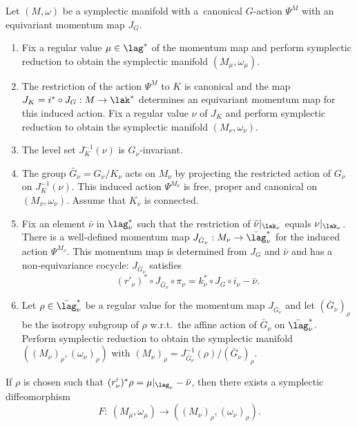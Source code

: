 \begin{theorem}\label{thm:hamredstages}
Let $(M,\omega)$ be a symplectic manifold with a~canonical $G$-action $\Psi^M$ with an equivariant momentum map $J_G$.
\begin{enumerate}\itemsep=0pt
\item[$1.$] Fix a regular value $\mu\in\lag^*$ of the momentum map and perform symplectic reduction to obtain the symplectic manifold $(M_\mu,\omega_\mu)$.
\item[$2.$] The restriction of the action $\Psi^M$ to $K$ is canonical and the map $J_K=i^*\circ J_G:M\to \lak^*$ determines an equivariant momentum map for this induced action. Fix a regular value $\nu$ of $J_K$ and perform symplectic reduction to obtain the symplectic manifold $(M_\nu,\omega_\nu)$.


\item[$3.$] The level set $J^{-1}_K(\nu)$ is $G_\nu$-invariant.
\item[$4.$] The group $\bar G_\nu =G_\nu/K_\nu$ acts on $M_\nu$ by projecting the restricted action of $G_\nu$ on $J^{-1}_K(\nu)$. This induced action $\Psi^{M_\nu}$ is free, proper and canonical on $(M_\nu, \omega_\nu)$. Assume that $K_\nu$ is connected.
\item[$5.$] Fix an element $\bar \nu$ in $\lag_\nu^*$ such that the restriction of $\bar \nu|_{\lak_\nu}$ equals $\nu|_{\lak_\nu}$. There is a well-defined momentum map $J_{\bar G_\nu}: M_\nu \to \bar\lag^*_\nu$  for the induced action $\Psi^{M_\nu}$. This momentum map is determined from $J_G$ and $\bar \nu$ and has a non-equivariance cocycle:  $J_{\bar G_\nu}$ satisfies
\[(r'_\nu)^* \circ J_{\bar G_\nu} \circ \pi_\nu = k_\nu^*\circ J_G \circ i_\nu  -\bar \nu.\]
\item[$6.$] Let $\rho\in \bar\lag^*_\nu$ be a regular value for the momentum map $J_{\bar G_\nu}$ and let $(\bar G_{\nu})_\rho$ be the isotropy subgroup of $\rho$ w.r.t.\ the affine action of $\bar G_\nu$ on $\bar\lag_\nu^*$. Perform symplectic reduction to obtain the symplectic manifold $((M_\nu)_\rho, (\omega_\nu)_\rho)$ with $(M_\nu)_\rho = J^{-1}_{\bar G_\nu}(\rho)/(\bar G_\nu)_\rho$.
 \end{enumerate}
  If $\rho$ is chosen such that $(r'_\nu)^*\rho = \mu|_{\lag_\nu} - \bar \nu$, then there exists a symplectic diffeomorphism \[F: \ (M_\mu,\omega_\mu)\to ((M_\nu)_\rho, (\omega_\nu)_\rho).\]
\end{theorem}
